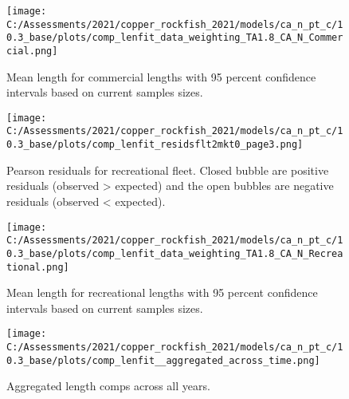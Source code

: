 \documentclass[11pt,
  english,
  a4paper,
]{article}
\begin{document}
\begin{figure}
\centering
\texttt{[image: C:/Assessments/2021/copper\_rockfish\_2021/models/ca\_n\_pt\_c/10.3\_base/plots/comp\_lenfit\_data\_weighting\_TA1.8\_CA\_N\_Commercial.png]}
\caption{Mean length for commercial lengths with 95 percent confidence intervals based on current samples sizes.\label{fig:com-mean-len-fit}}
\end{figure}

\tagmcend\tagstructend


\begin{figure}
\centering
\texttt{[image: C:/Assessments/2021/copper\_rockfish\_2021/models/ca\_n\_pt\_c/10.3\_base/plots/comp\_lenfit\_residsflt2mkt0\_page3.png]}
\caption{Pearson residuals for recreational fleet. Closed bubble are positive residuals (observed \textgreater{} expected) and the open bubbles are negative residuals (observed \textless{} expected).\label{fig:rec-pearson}}
\end{figure}

\tagmcend\tagstructend


\begin{figure}
\centering
\texttt{[image: C:/Assessments/2021/copper\_rockfish\_2021/models/ca\_n\_pt\_c/10.3\_base/plots/comp\_lenfit\_data\_weighting\_TA1.8\_CA\_N\_Recreational.png]}
\caption{Mean length for recreational lengths with 95 percent confidence intervals based on current samples sizes.\label{fig:rec-mean-len-fit}}
\end{figure}

\tagmcend\tagstructend


\begin{figure}
\centering
\texttt{[image: C:/Assessments/2021/copper\_rockfish\_2021/models/ca\_n\_pt\_c/10.3\_base/plots/comp\_lenfit\_\_aggregated\_across\_time.png]}
\caption{Aggregated length comps across all years.\label{fig:agg-len-fit}}
\end{figure}

\tagmcend\tagstructend

\end{document}

